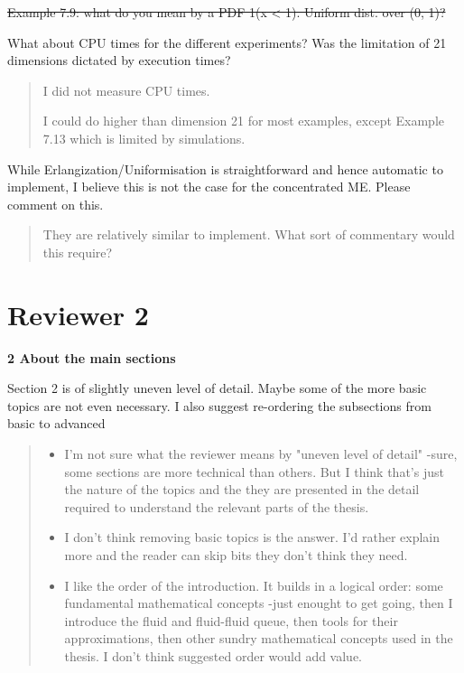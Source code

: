 \documentclass[a4paper]{article}
\begin{document}
\st{Example 7.9: what do you mean by a PDF 1(x < 1). Uniform dist. over (0, 1)?}

What about CPU times for the different experiments? Was the limitation of 21 dimensions dictated by execution times?
\begin{quote}
    I did not measure CPU times. 

    I could do higher than dimension 21 for most examples, except Example 7.13 which is limited by simulations.
\end{quote}

While Erlangization/Uniformisation is straightforward and hence automatic to implement, I believe this is not the case for the concentrated ME. Please comment on this.
\begin{quote}
    They are relatively similar to implement. What sort of commentary would this require?
\end{quote}

\pagebreak
\section{Reviewer 2}

\noindent\textbf{2 About the main sections}

Section 2 is of slightly uneven level of detail. Maybe some of the more basic topics are not even necessary. I also suggest re-ordering the subsections from basic to advanced
\begin{quote}
    \begin{itemize}
        \item I'm not sure what the reviewer means by "uneven level of detail" -sure, some sections are more technical than others. But I think that's just the nature of the topics and the they are presented in the detail required to understand the relevant parts of the thesis. 

        \item I don't think removing basic topics is the answer. I'd rather explain more and the reader can skip bits they don't think they need. 

        \item I like the order of the introduction. It builds in a logical order: some fundamental mathematical concepts -just enought to get going, then I introduce the fluid and fluid-fluid queue, then tools for their approximations, then other sundry mathematical concepts used in the thesis. I don't think suggested order would add value.  
    \end{itemize}
\end{quote}
\end{document}
